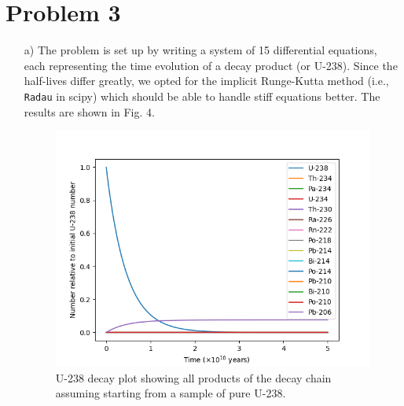\documentclass{article}
\begin{document}
\section*{Problem 3}
\begin{itemize}
    \item[a)] The problem is set up by writing a system of 15 differential equations, each representing the time evolution of a decay product (or U-238). Since the half-lives differ greatly, we opted for the implicit Runge-Kutta method (i.e., \verb|Radau| in scipy) which should be able to handle stiff equations better. The results are shown in Fig. 4.

    \begin{figure}[h]
        \centering
        \includegraphics[scale=0.56]{images/prob3_u238_decay.png}
        \caption{U-238 decay plot showing all products of the decay chain assuming starting from a sample of pure U-238.}
    \end{figure}
    

\end{itemize}
\end{document}
